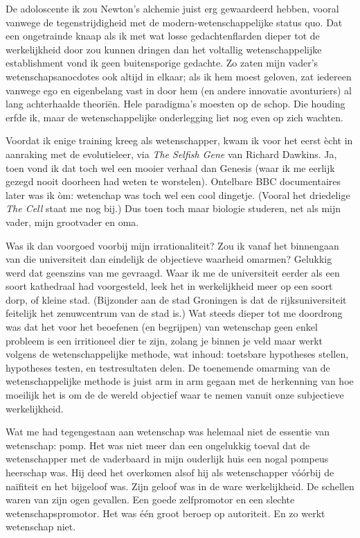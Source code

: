 \documentclass[12pt,a4paper]{article}
\begin{document}
De adoloscente ik zou Newton's alchemie juist erg gewaardeerd hebben, vooral vanwege de tegenstrijdigheid met de modern-wetenschappelijke status quo. Dat een ongetrainde knaap als ik met wat losse gedachtenflarden dieper tot de werkelijkheid door zou kunnen dringen dan het voltallig wetenschappelijke establishment vond ik geen buitensporige gedachte. Zo zaten mijn vader's wetenschapsanocdotes ook altijd in elkaar; als ik hem moest geloven, zat iedereen vanwege ego en eigenbelang vast in door hem (en andere innovatie avonturiers) al lang achterhaalde theoriën. Hele paradigma's moesten op de schop. Die houding erfde ik, maar de wetenschappelijke onderlegging liet nog even op zich wachten.

Voordat ik enige training kreeg als wetenschapper, kwam ik voor het eerst ècht in aanraking met de evolutieleer, via \emph{The Selfish Gene} van Richard Dawkins. Ja, toen vond ik dat toch wel een mooier verhaal dan Genesis (waar ik me eerlijk gezegd nooit doorheen had weten te worstelen). Ontelbare BBC documentaires later was ik òm: wetenchap was toch wel een cool dingetje. (Vooral het driedelige \emph{The Cell} staat me nog bij.) Dus toen toch maar biologie studeren, net als mijn vader, mijn grootvader en oma.

Was ik dan voorgoed voorbij mijn irrationaliteit? Zou ik vanaf het binnengaan van die universiteit dan eindelijk de objectieve waarheid omarmen? Gelukkig werd dat geenszins van me gevraagd. Waar ik me de universiteit eerder als een soort kathedraal had voorgesteld, leek het in werkelijkheid meer op een soort dorp, of kleine stad. (Bijzonder aan de stad Groningen is dat de rijksuniversiteit feitelijk het zenuwcentrum van de stad is.) Wat steeds dieper tot me doordrong was dat het voor het beoefenen (en begrijpen) van wetenschap geen enkel probleem is een irritioneel dier te zijn, zolang je binnen je veld maar werkt volgens de wetenschappelijke methode, wat inhoud: toetsbare hypotheses stellen, hypotheses testen, en testresultaten delen. De toenemende omarming van de wetenschappelijke methode is juist arm in arm gegaan met de herkenning van hoe moeilijk het is om de de wereld objectief waar te nemen vanuit onze subjectieve werkelijkheid.

Wat me had tegengestaan aan wetenschap was helemaal niet de essentie van wetenschap: pomp. Het was niet meer dan een ongelukkig toeval dat de wetenschapper met de vaderbaard in mijn ouderlijk huis een nogal pompeus heerschap was. Hij deed het overkomen alsof hij als wetenschapper vóórbij de naïfiteit en het bijgeloof was. Zijn geloof was in de ware werkelijkheid. De schellen waren van zijn ogen gevallen. Een goede zelfpromotor en een slechte wetenschapspromotor. Het was één groot beroep op autoriteit. En zo werkt wetenschap niet.
\end{document}
